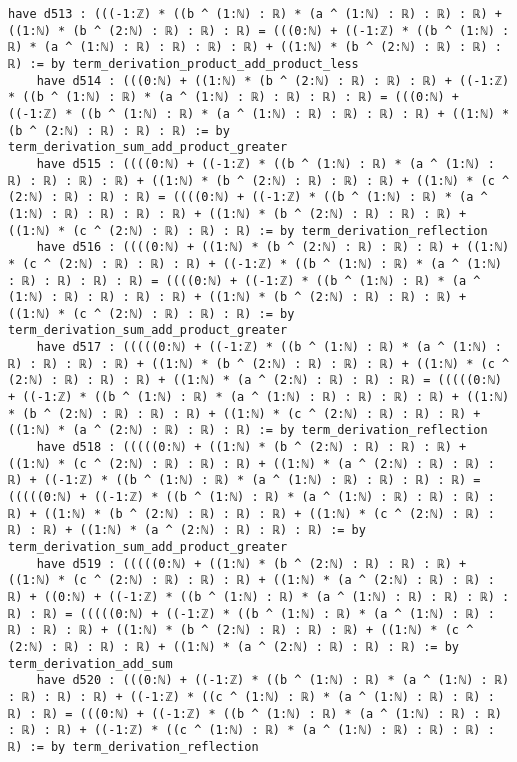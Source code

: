 \documentclass{article}
\begin{document}
\begin{tcolorbox}[colback=white!10, width=\linewidth]
\begin{lstlisting}[language=Lean4]
    have d513 : (((-1:ℤ) * ((b ^ (1:ℕ) : ℝ) * (a ^ (1:ℕ) : ℝ) : ℝ) : ℝ) + ((1:ℕ) * (b ^ (2:ℕ) : ℝ) : ℝ) : ℝ) = (((0:ℕ) + ((-1:ℤ) * ((b ^ (1:ℕ) : ℝ) * (a ^ (1:ℕ) : ℝ) : ℝ) : ℝ) : ℝ) + ((1:ℕ) * (b ^ (2:ℕ) : ℝ) : ℝ) : ℝ) := by term_derivation_product_add_product_less
    have d514 : (((0:ℕ) + ((1:ℕ) * (b ^ (2:ℕ) : ℝ) : ℝ) : ℝ) + ((-1:ℤ) * ((b ^ (1:ℕ) : ℝ) * (a ^ (1:ℕ) : ℝ) : ℝ) : ℝ) : ℝ) = (((0:ℕ) + ((-1:ℤ) * ((b ^ (1:ℕ) : ℝ) * (a ^ (1:ℕ) : ℝ) : ℝ) : ℝ) : ℝ) + ((1:ℕ) * (b ^ (2:ℕ) : ℝ) : ℝ) : ℝ) := by term_derivation_sum_add_product_greater
    have d515 : ((((0:ℕ) + ((-1:ℤ) * ((b ^ (1:ℕ) : ℝ) * (a ^ (1:ℕ) : ℝ) : ℝ) : ℝ) : ℝ) + ((1:ℕ) * (b ^ (2:ℕ) : ℝ) : ℝ) : ℝ) + ((1:ℕ) * (c ^ (2:ℕ) : ℝ) : ℝ) : ℝ) = ((((0:ℕ) + ((-1:ℤ) * ((b ^ (1:ℕ) : ℝ) * (a ^ (1:ℕ) : ℝ) : ℝ) : ℝ) : ℝ) + ((1:ℕ) * (b ^ (2:ℕ) : ℝ) : ℝ) : ℝ) + ((1:ℕ) * (c ^ (2:ℕ) : ℝ) : ℝ) : ℝ) := by term_derivation_reflection
    have d516 : ((((0:ℕ) + ((1:ℕ) * (b ^ (2:ℕ) : ℝ) : ℝ) : ℝ) + ((1:ℕ) * (c ^ (2:ℕ) : ℝ) : ℝ) : ℝ) + ((-1:ℤ) * ((b ^ (1:ℕ) : ℝ) * (a ^ (1:ℕ) : ℝ) : ℝ) : ℝ) : ℝ) = ((((0:ℕ) + ((-1:ℤ) * ((b ^ (1:ℕ) : ℝ) * (a ^ (1:ℕ) : ℝ) : ℝ) : ℝ) : ℝ) + ((1:ℕ) * (b ^ (2:ℕ) : ℝ) : ℝ) : ℝ) + ((1:ℕ) * (c ^ (2:ℕ) : ℝ) : ℝ) : ℝ) := by term_derivation_sum_add_product_greater
    have d517 : (((((0:ℕ) + ((-1:ℤ) * ((b ^ (1:ℕ) : ℝ) * (a ^ (1:ℕ) : ℝ) : ℝ) : ℝ) : ℝ) + ((1:ℕ) * (b ^ (2:ℕ) : ℝ) : ℝ) : ℝ) + ((1:ℕ) * (c ^ (2:ℕ) : ℝ) : ℝ) : ℝ) + ((1:ℕ) * (a ^ (2:ℕ) : ℝ) : ℝ) : ℝ) = (((((0:ℕ) + ((-1:ℤ) * ((b ^ (1:ℕ) : ℝ) * (a ^ (1:ℕ) : ℝ) : ℝ) : ℝ) : ℝ) + ((1:ℕ) * (b ^ (2:ℕ) : ℝ) : ℝ) : ℝ) + ((1:ℕ) * (c ^ (2:ℕ) : ℝ) : ℝ) : ℝ) + ((1:ℕ) * (a ^ (2:ℕ) : ℝ) : ℝ) : ℝ) := by term_derivation_reflection
    have d518 : (((((0:ℕ) + ((1:ℕ) * (b ^ (2:ℕ) : ℝ) : ℝ) : ℝ) + ((1:ℕ) * (c ^ (2:ℕ) : ℝ) : ℝ) : ℝ) + ((1:ℕ) * (a ^ (2:ℕ) : ℝ) : ℝ) : ℝ) + ((-1:ℤ) * ((b ^ (1:ℕ) : ℝ) * (a ^ (1:ℕ) : ℝ) : ℝ) : ℝ) : ℝ) = (((((0:ℕ) + ((-1:ℤ) * ((b ^ (1:ℕ) : ℝ) * (a ^ (1:ℕ) : ℝ) : ℝ) : ℝ) : ℝ) + ((1:ℕ) * (b ^ (2:ℕ) : ℝ) : ℝ) : ℝ) + ((1:ℕ) * (c ^ (2:ℕ) : ℝ) : ℝ) : ℝ) + ((1:ℕ) * (a ^ (2:ℕ) : ℝ) : ℝ) : ℝ) := by term_derivation_sum_add_product_greater
    have d519 : (((((0:ℕ) + ((1:ℕ) * (b ^ (2:ℕ) : ℝ) : ℝ) : ℝ) + ((1:ℕ) * (c ^ (2:ℕ) : ℝ) : ℝ) : ℝ) + ((1:ℕ) * (a ^ (2:ℕ) : ℝ) : ℝ) : ℝ) + ((0:ℕ) + ((-1:ℤ) * ((b ^ (1:ℕ) : ℝ) * (a ^ (1:ℕ) : ℝ) : ℝ) : ℝ) : ℝ) : ℝ) = (((((0:ℕ) + ((-1:ℤ) * ((b ^ (1:ℕ) : ℝ) * (a ^ (1:ℕ) : ℝ) : ℝ) : ℝ) : ℝ) + ((1:ℕ) * (b ^ (2:ℕ) : ℝ) : ℝ) : ℝ) + ((1:ℕ) * (c ^ (2:ℕ) : ℝ) : ℝ) : ℝ) + ((1:ℕ) * (a ^ (2:ℕ) : ℝ) : ℝ) : ℝ) := by term_derivation_add_sum
    have d520 : (((0:ℕ) + ((-1:ℤ) * ((b ^ (1:ℕ) : ℝ) * (a ^ (1:ℕ) : ℝ) : ℝ) : ℝ) : ℝ) + ((-1:ℤ) * ((c ^ (1:ℕ) : ℝ) * (a ^ (1:ℕ) : ℝ) : ℝ) : ℝ) : ℝ) = (((0:ℕ) + ((-1:ℤ) * ((b ^ (1:ℕ) : ℝ) * (a ^ (1:ℕ) : ℝ) : ℝ) : ℝ) : ℝ) + ((-1:ℤ) * ((c ^ (1:ℕ) : ℝ) * (a ^ (1:ℕ) : ℝ) : ℝ) : ℝ) : ℝ) := by term_derivation_reflection

\end{lstlisting}
\end{tcolorbox}
\end{document}
